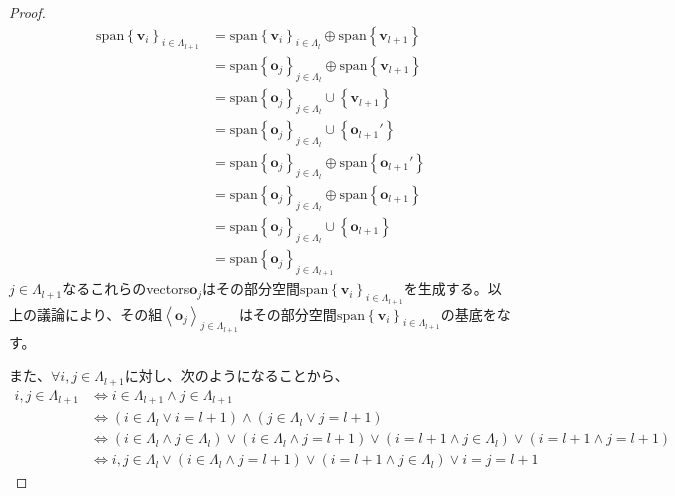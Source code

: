 \documentclass[dvipdfmx]{jsarticle}
\begin{document}
\begin{proof}
\begin{align*}
\mathrm{span}\left\{ \mathbf{v}_{i} \right\}_{i \in \varLambda_{l + 1}} &= \mathrm{span}\left\{ \mathbf{v}_{i} \right\}_{i \in \varLambda_{l}} \oplus \mathrm{span}\left\{ \mathbf{v}_{l + 1} \right\}\\
&= \mathrm{span}\left\{ \mathbf{o}_{j} \right\}_{j \in \varLambda_{l}} \oplus \mathrm{span}\left\{ \mathbf{v}_{l + 1} \right\}\\
&= \mathrm{span}{\left\{ \mathbf{o}_{j} \right\}_{j \in \varLambda_{l}} \cup \left\{ \mathbf{v}_{l + 1} \right\}}\\
&= \mathrm{span}{\left\{ \mathbf{o}_{j} \right\}_{j \in \varLambda_{l}} \cup \left\{ \mathbf{o}_{l + 1}' \right\}}\\
&= \mathrm{span}\left\{ \mathbf{o}_{j} \right\}_{j \in \varLambda_{l}} \oplus \mathrm{span}\left\{ \mathbf{o}_{l + 1}' \right\}\\
&= \mathrm{span}\left\{ \mathbf{o}_{j} \right\}_{j \in \varLambda_{l}} \oplus \mathrm{span}\left\{ \mathbf{o}_{l + 1} \right\}\\
&= \mathrm{span}{\left\{ \mathbf{o}_{j} \right\}_{j \in \varLambda_{l}} \cup \left\{ \mathbf{o}_{l + 1} \right\}}\\
&= \mathrm{span}\left\{ \mathbf{o}_{j} \right\}_{j \in \varLambda_{l + 1}}
\end{align*}
$j \in \varLambda_{l + 1}$なるこれらのvectors$\mathbf{o}_{j}$はその部分空間$\mathrm{span}\left\{ \mathbf{v}_{i} \right\}_{i \in \varLambda_{l + 1}}$を生成する。以上の議論により、その組$\left\langle \mathbf{o}_{j} \right\rangle_{j \in \varLambda_{l + 1}}$はその部分空間$\mathrm{span}\left\{ \mathbf{v}_{i} \right\}_{i \in \varLambda_{l + 1}}$の基底をなす。\par
また、$\forall i,j \in \varLambda_{l + 1}$に対し、次のようになることから、
\begin{align*}
i,j \in \varLambda_{l + 1} &\Leftrightarrow i \in \varLambda_{l + 1} \land j \in \varLambda_{l + 1}\\
&\Leftrightarrow \left( i \in \varLambda_{l} \vee i = l + 1 \right) \land \left( j \in \varLambda_{l} \vee j = l + 1 \right)\\
&\Leftrightarrow \left( i \in \varLambda_{l} \land j \in \varLambda_{l} \right) \vee \left( i \in \varLambda_{l} \land j = l + 1 \right) \vee \left( i = l + 1 \land j \in \varLambda_{l} \right) \vee (i = l + 1 \land j = l + 1)\\
&\Leftrightarrow i,j \in \varLambda_{l} \vee \left( i \in \varLambda_{l} \land j = l + 1 \right) \vee \left( i = l + 1 \land j \in \varLambda_{l} \right) \vee i = j = l + 1

\end{align*}
\end{proof}
\end{document}
